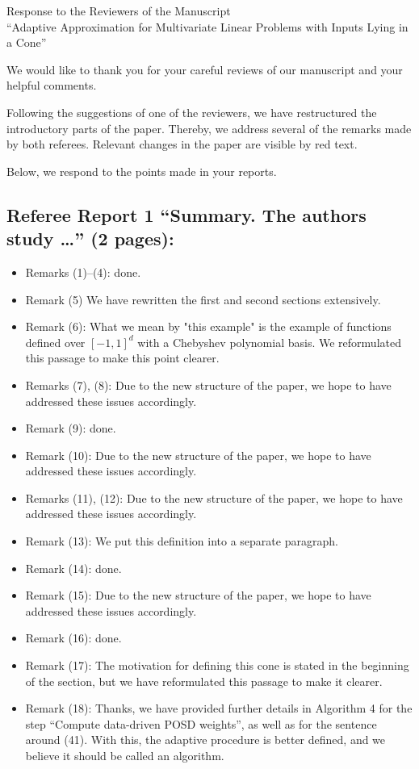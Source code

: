 \documentclass[11pt]{article}
\begin{document}
\begin{center}
 
{\Large Response to the Reviewers of the Manuscript\\
``Adaptive Approximation for Multivariate Linear Problems with Inputs Lying in a Cone''}
\end{center}

\medskip

\noindent We would like to thank you for your careful reviews of our manuscript and your helpful comments. 

Following the suggestions of one of the reviewers, we have restructured the introductory parts of the paper. Thereby, we address several of the remarks 
made by both referees. Relevant changes in the paper are visible by red text. 

Below, we respond to the points made in your reports.

\subsection*{Referee Report 1 ``Summary. The authors study \ldots '' (2 pages):}

\begin{itemize}
\item Remarks (1)--(4): done. 
\item Remark (5) We have rewritten the first and second sections extensively.
\item Remark (6): What we mean by "this example" is the example of functions defined over $[-1,1]^d$ with a Chebyshev polynomial basis. We reformulated this passage to make this point clearer. 
\item Remarks (7), (8): Due to the new structure of the paper, we hope to have addressed these issues accordingly. 
\item Remark (9): done. 
\item Remark (10): Due to the new structure of the paper, we hope to have addressed these issues accordingly. 
\item Remarks (11), (12): Due to the new structure of the paper, we hope to have addressed these issues accordingly. 
\item Remark (13): We put this definition into a separate paragraph. 
\item Remark (14): done. 
\item Remark (15): Due to the new structure of the paper, we hope to have addressed these issues accordingly. 
\item Remark (16): done. 
\item Remark (17): The motivation for defining this cone is stated in the beginning of the section, but we have reformulated this passage to make it clearer. 
\item Remark (18): Thanks, we have provided further details in Algorithm 4 for the step ``Compute data-driven POSD weights'', as well as for the sentence around (41). With this, the adaptive procedure is better defined, and we believe it should be called an algorithm.
\end{itemize}
\end{document}
